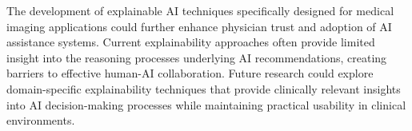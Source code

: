 The development of explainable AI techniques specifically designed for medical imaging applications could further enhance physician trust and adoption of AI assistance systems. Current explainability approaches often provide limited insight into the reasoning processes underlying AI recommendations, creating barriers to effective human-AI collaboration. Future research could explore domain-specific explainability techniques that provide clinically relevant insights into AI decision-making processes while maintaining practical usability in clinical environments. 